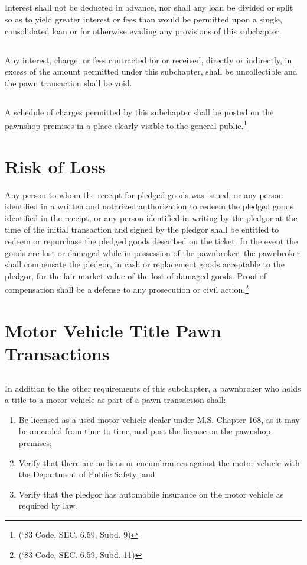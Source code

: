 \subsection{}
Interest shall not be deducted in advance, nor shall any loan be divided or split so as to yield greater interest or fees than would be permitted upon a single, consolidated loan or for otherwise evading any provisions of this subchapter.
\subsection{}
Any interest, charge, or fees contracted for or received, directly or indirectly, in excess of the amount permitted under this subchapter, shall be uncollectible and the pawn transaction shall be void.
\subsection{}
A schedule of charges permitted by this subchapter shall be posted on the pawnshop premises in a place clearly visible to the general public.\footnote{(‘83 Code, SEC. 6.59, Subd. 9)}

\section{Risk of Loss}
Any person to whom the receipt for pledged goods was issued, or any person identified in a written and notarized authorization to redeem the pledged goods identified in the receipt, or any person identified in writing by the pledgor at the time of the initial transaction and signed by the pledgor shall be entitled to redeem or repurchase the pledged goods described on the ticket.  In the event the goods are lost or damaged while in possession of the pawnbroker, the pawnbroker shall compensate the pledgor, in cash or replacement goods acceptable to the pledgor, for the fair market value of the lost of damaged goods.  Proof of compensation shall be a defense to any prosecution or civil action.\footnote{(‘83 Code, SEC. 6.59, Subd. 11)}

\section{Motor Vehicle Title Pawn Transactions}
\subsection{}
In addition to the other requirements of this subchapter, a pawnbroker who holds a title to a motor vehicle as part of a pawn transaction shall:
\begin{enumerate}[{\indent}1)]
    \item Be licensed as a used motor vehicle dealer under M.S. Chapter 168, as it may be amended from time to time, and post the license on the pawnshop premises;
    \item Verify that there are no liens or encumbrances against the motor vehicle with the Department of Public Safety; and
    \item Verify that the pledgor has automobile insurance on the motor vehicle as required by law.
\end{enumerate}
